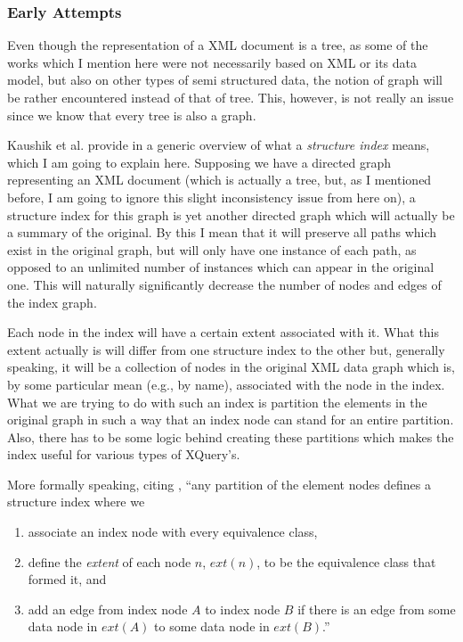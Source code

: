 \documentclass[a4paper,10pt]{article}
\begin{document}
\subsubsection*{Early Attempts}

Even though the representation of  a XML document is a tree, as some of the works
which I mention here were not necessarily based on XML or its data model, but also on
other types of semi structured data, the notion of graph will be rather encountered instead
of that of tree. This, however, is not really an issue since we know that every tree is
also a graph.

Kaushik et al. provide in \cite{kau04} a generic overview of what a \textit{structure index}
means, which I am going to explain here. Supposing we have a directed graph representing
an XML document (which is actually a tree, but, as I mentioned before, I am going to ignore
this slight inconsistency issue from here on), a structure index for this graph is yet another directed
graph which will actually be a summary of the original. By this I mean that it will preserve
all paths which exist in the original graph, but will only have one instance of each path,
as opposed to an unlimited number of instances which can appear in the original one. This
will naturally significantly decrease the number of nodes and edges of the index graph.

Each node in the index will have a certain extent associated with it. What this extent actually
is will differ from one structure index to the other but, generally speaking, it will be a
collection of nodes in the original XML data graph which is, by some particular mean
(e.g., by name), associated with the node in the index. What we are trying to do with
such an index is partition the elements in the original graph in such a way that an index
node can stand for an entire partition. Also, there has to be some logic behind creating
these partitions which makes the index useful for various types of XQuery's.

More formally speaking, citing \cite{kau04}, ``any partition of the element nodes
defines a structure index where we

\begin{enumerate}
\item associate an index node with every equivalence class,
\item define the \textit{extent} of each node $n$, $ext(n)$, to be the equivalence class
that formed it, and
\item add an edge from index node $A$ to index node $B$ if there is an edge from some
data node in $ext(A)$ to some data node in $ext(B)$.''
\end{enumerate}
\end{document}
